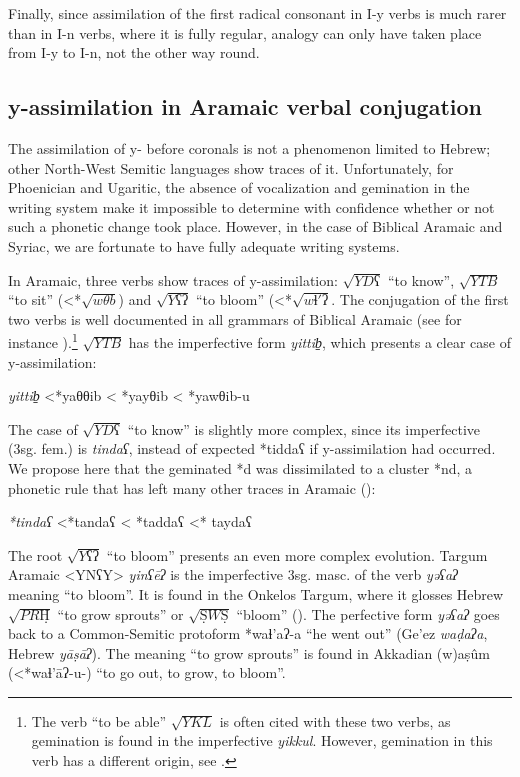 \documentclass[oldfontcommands,oneside,a4paper,11pt]{article}
\newcommand{\racine}[1]{\begin{math}\sqrt{#1}\end{math}}
\newcommand{\forme}[1]{\textit{#1}}
\begin{document}
\begin{sloppypar}
Finally, since assimilation of the first radical consonant in I-y verbs is much rarer than in I-n verbs, where it is fully regular, analogy can only have taken place from I-y to I-n, not the other way round.

\subsection{y-assimilation in Aramaic verbal conjugation} \label{aramaic}
The assimilation of y- before coronals is not a phenomenon limited to Hebrew; other North-West Semitic languages show traces of it. Unfortunately, for Phoenician and Ugaritic, the absence of vocalization and gemination in the writing system make it impossible to determine with confidence whether or not such a phonetic change took place. However, in the case of Biblical Aramaic and Syriac, we are fortunate to have fully adequate writing systems.


 In Aramaic, three verbs show traces of y-assimilation: \racine{YDʕ} ``to know'', \racine{YTB} ``to sit'' (<*\racine{wθb}) and \racine{Yʕʔ} ``to bloom'' (<*\racine{wɬ'ʔ}. The conjugation of the first two verbs is well documented in all grammars of Biblical Aramaic (see for instance \citealt[73]{rosenthal88arameen}).\footnote{The verb ``to be able'' \racine{YKL} is often cited with these two verbs, as gemination is found in the imperfective \forme{yikkul}. However, gemination in this verb has a different origin, see \citet[471]{huehnergard06}.} \racine{YTB} has the imperfective form \forme{yittib̠}, which presents a clear case of y-assimilation: 
 
 \begin{exe}
\ex \label{asseoir}	
\glt \forme{yittib̠} <*yaθθib < *yayθib < *yawθib-u 
\end{exe}
The case of  \racine{YDʕ} ``to know'' is slightly more complex, since its imperfective (3sg. fem.)  is \forme{tindaʕ}, instead of expected *tiddaʕ if y-assimilation had occurred. We propose here that the geminated *d was dissimilated to a cluster *nd, a phonetic rule that has left many other traces in Aramaic (\citealt[83]{davidson1848}):
 \begin{exe}
\ex \label{savoir}	 \forme{*tindaʕ} <*tandaʕ < *taddaʕ <* taydaʕ 
\end{exe}
	The root \racine{Yʕʔ} ``to bloom'' presents an even more complex evolution. Targum Aramaic <YNʕY> \forme{yinʕēʔ} is the imperfective 3sg. masc. of the verb \forme{yǝʕaʔ} meaning ``to bloom''. It is found in the Onkelos Targum, where it glosses Hebrew \racine{PRḤ} ``to grow sprouts'' or \racine{ṢWṢ} ``bloom'' (\citealt[583]{jastrow1903targum}). The perfective form \forme{yəʕaʔ} goes back to a Common-Semitic protoform *waɬ'aʔ-a ``he went out'' (Ge'ez \forme{waḍaʔa}, Hebrew \forme{yāṣāʔ}). The meaning ``to grow sprouts'' is found in Akkadian (w)aṣûm (<*waɬ'āʔ-u-) ``to go out, to grow, to bloom''. 


\end{sloppypar}
\end{document}
